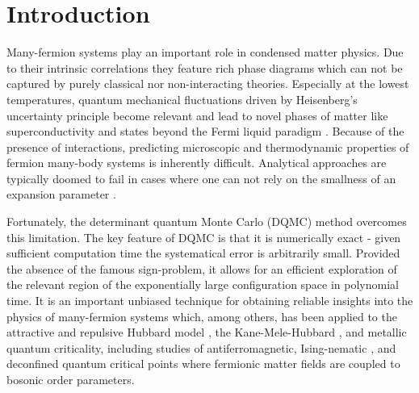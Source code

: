 \documentclass[submission, Phys]{SciPost}
\begin{document}
\section{Introduction}


Many-fermion systems play an important role in condensed matter physics. Due to their intrinsic correlations they feature rich phase diagrams which can not be captured by purely classical nor non-interacting theories. Especially at the lowest temperatures, quantum mechanical fluctuations driven by Heisenberg's uncertainty principle become relevant and lead to novel phases of matter like superconductivity and states beyond the Fermi liquid paradigm \cite{Bauer2020, Schattner2016}. Because of the presence of interactions, predicting microscopic and thermodynamic properties of fermion many-body systems is inherently difficult. Analytical approaches are typically doomed to fail in cases where one can not rely on the smallness of an expansion parameter \cite{Berg2019}.

Fortunately, the determinant quantum Monte Carlo (DQMC) method \cite{Blankenbecler1981, Loh2005, Scalapino1993, Santos2003, Assaad2002a} overcomes this limitation. The key feature of DQMC is that it is numerically exact - given sufficient computation time the systematical error is arbitrarily small. Provided the absence of the famous sign-problem\cite{Loh1990, Troyer2005}, it allows for an efficient exploration of the relevant region of the exponentially large configuration space in polynomial time. It is an important unbiased technique for obtaining reliable insights into the physics of many-fermion systems which, among others, has been applied to the attractive and repulsive Hubbard model \cite{Hirsch1985, White1989, Moreo1991}, the Kane-Mele-Hubbard \cite{Hohenadler2012}, and metallic quantum criticality, including studies of antiferromagnetic\cite{Bauer2020, Schattner2016, Gerlach2017, Berg2019}, Ising-nematic \cite{SchattnerLederer2016}, and deconfined quantum critical points \cite{Gazit2017} where fermionic matter fields are coupled to bosonic order parameters.
\end{document}
